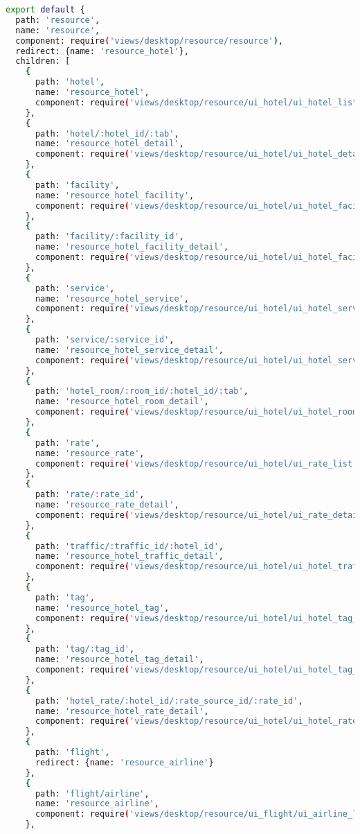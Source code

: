 \begin{lstlisting}[language=bash]
export default {
  path: 'resource',
  name: 'resource',
  component: require('views/desktop/resource/resource'),
  redirect: {name: 'resource_hotel'},
  children: [
    {
      path: 'hotel',
      name: 'resource_hotel',
      component: require('views/desktop/resource/ui_hotel/ui_hotel_list')
    },
    {
      path: 'hotel/:hotel_id/:tab',
      name: 'resource_hotel_detail',
      component: require('views/desktop/resource/ui_hotel/ui_hotel_detail')
    },
    {
      path: 'facility',
      name: 'resource_hotel_facility',
      component: require('views/desktop/resource/ui_hotel/ui_hotel_facility_list')
    },
    {
      path: 'facility/:facility_id',
      name: 'resource_hotel_facility_detail',
      component: require('views/desktop/resource/ui_hotel/ui_hotel_facility_detail')
    },
    {
      path: 'service',
      name: 'resource_hotel_service',
      component: require('views/desktop/resource/ui_hotel/ui_hotel_service_list')
    },
    {
      path: 'service/:service_id',
      name: 'resource_hotel_service_detail',
      component: require('views/desktop/resource/ui_hotel/ui_hotel_service_detail')
    },
    {
      path: 'hotel_room/:room_id/:hotel_id/:tab',
      name: 'resource_hotel_room_detail',
      component: require('views/desktop/resource/ui_hotel/ui_hotel_room_detail')
    },
    {
      path: 'rate',
      name: 'resource_rate',
      component: require('views/desktop/resource/ui_hotel/ui_rate_list')
    },
    {
      path: 'rate/:rate_id',
      name: 'resource_rate_detail',
      component: require('views/desktop/resource/ui_hotel/ui_rate_detail')
    },
    {
      path: 'traffic/:traffic_id/:hotel_id',
      name: 'resource_hotel_traffic_detail',
      component: require('views/desktop/resource/ui_hotel/ui_hotel_traffic_detail')
    },
    {
      path: 'tag',
      name: 'resource_hotel_tag',
      component: require('views/desktop/resource/ui_hotel/ui_hotel_tag_list')
    },
    {
      path: 'tag/:tag_id',
      name: 'resource_hotel_tag_detail',
      component: require('views/desktop/resource/ui_hotel/ui_hotel_tag_detail')
    },
    {
      path: 'hotel_rate/:hotel_id/:rate_source_id/:rate_id',
      name: 'resource_hotel_rate_detail',
      component: require('views/desktop/resource/ui_hotel/ui_hotel_rate_detail')
    },
    {
      path: 'flight',
      redirect: {name: 'resource_airline'}
    },
    {
      path: 'flight/airline',
      name: 'resource_airline',
      component: require('views/desktop/resource/ui_flight/ui_airline_list')
    },

\end{lstlisting}
